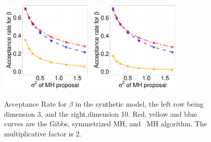 {\begin{figure}[H]
  \begin{minipage}[!hp]{0.99\linewidth}
    \includegraphics [width=0.40\textwidth, angle=0]{figs/acc/EXP_D3beta_k2.pdf}
	\hspace{.5in}
    \includegraphics [width=0.40\textwidth, angle=0]{figs/acc/EXP_D10beta_k2.pdf}
  \end{minipage}
    \caption{Acceptance Rate for $\beta$ in the synthetic model, the left row being dimension 3, and the right,dimension 10.  Red, yellow and blue curves are the Gibbs, symmetrized MH,
 and \naive\ MH  algorithm. The multiplicative factor is $2$. }
     \label{fig:ACC_EXP}
  \end{figure}



}
